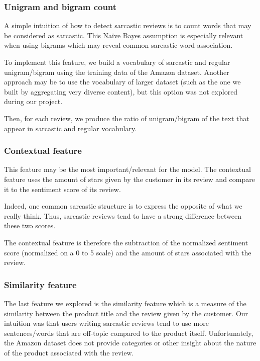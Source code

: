 \documentclass[10pt,twocolumn,letterpaper]{article}
\begin{document}
\subsubsection{Unigram and bigram count}

A simple intuition of how to detect sarcastic reviews is to count words that may be considered as sarcastic.
This Naïve Bayes assumption is especially relevant when using bigrams which may reveal common sarcastic word association.

To implement this feature, we build a vocabulary of sarcastic and regular unigram/bigram using the training data of the Amazon dataset.
Another approach may  be to use the vocabulary of larger dataset (such as the one we built by aggregating very diverse content), but this option was not explored during our project.

Then, for each review, we produce the ratio of unigram/bigram of the text that appear in sarcastic and regular vocabulary.

\subsubsection{Contextual feature}

This feature may be the most important/relevant for the model.
The contextual feature uses the amount of stars given by the customer in its review and compare it to the sentiment score of its review.

Indeed, one common sarcastic structure is to express the opposite of what we really think.
Thus, sarcastic reviews tend to have a strong difference between these two scores.

The contextual feature is therefore the subtraction of the normalized sentiment score (normalized on a 0 to 5 scale) and the amount of stars associated with the review.

\subsubsection{Similarity feature}

The last feature we explored is the similarity feature which is a measure of the similarity between the product title and the review given by the customer.
Our intuition was that users writing sarcastic reviews tend to use more sentences/words that are off-topic compared to the product itself.
Unfortunately, the Amazon dataset does not provide categories or other insight about the nature of the product associated with the review.
\end{document}
